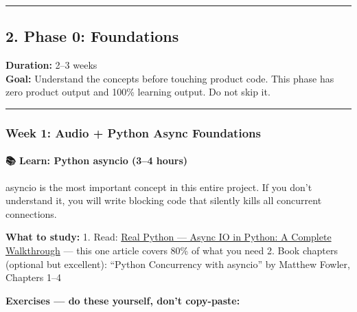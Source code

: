 \documentclass[
  11pt,
]{article}
\begin{document}
\begin{center}\rule{0.5\linewidth}{0.5pt}\end{center}

\hypertarget{phase-0-foundations}{%
\subsection{2. Phase 0: Foundations}\label{phase-0-foundations}}

\textbf{Duration:} 2--3 weeks\\
\textbf{Goal:} Understand the concepts before touching product code.
This phase has zero product output and 100\% learning output. Do not
skip it.

\begin{center}\rule{0.5\linewidth}{0.5pt}\end{center}

\hypertarget{week-1-audio-python-async-foundations}{%
\subsubsection{Week 1: Audio + Python Async
Foundations}\label{week-1-audio-python-async-foundations}}

\hypertarget{learn-python-asyncio-34-hours}{%
\paragraph{📚 Learn: Python asyncio (3--4
hours)}\label{learn-python-asyncio-34-hours}}

asyncio is the most important concept in this entire project. If you
don't understand it, you will write blocking code that silently kills
all concurrent connections.

\textbf{What to study:} 1. Read:
\href{https://realpython.com/async-io-python/}{Real Python --- Async IO
in Python: A Complete Walkthrough} --- this one article covers 80\% of
what you need 2. Book chapters (optional but excellent): ``Python
Concurrency with asyncio'' by Matthew Fowler, Chapters 1--4

\textbf{Exercises --- do these yourself, don't copy-paste:}
\end{document}
